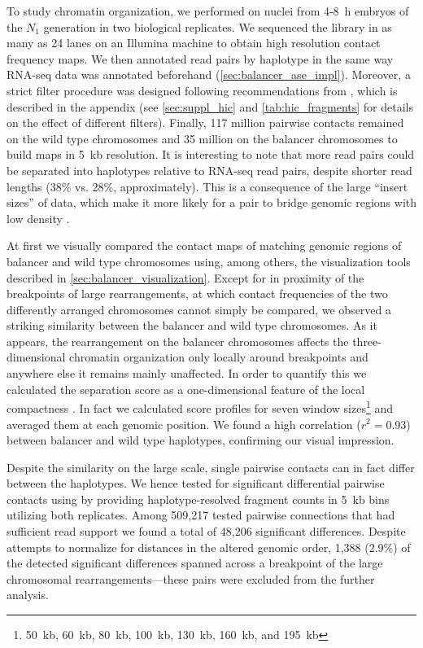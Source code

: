To study chromatin organization, we performed \hic on nuclei from 4-8~h embryos
of the $N_1$ generation in two biological replicates. We sequenced the \hic
library in as many as 24 lanes on an Illumina machine to obtain high resolution
contact frequency maps. We then annotated read pairs by haplotype in the same
way RNA-seq data was annotated beforehand (\cref{sec:balancer_ase_impl}).
Moreover, a strict filter procedure was designed following recommendations from
\cite{Ramirez2018}, which is described in the appendix (see \cref{sec:suppl_hic}
and \cref{tab:hic_fragments} for details on the effect of different filters).
Finally, 117 million pairwise contacts remained on the wild type chromosomes
and 35 million on the balancer chromosomes to build \hic maps in 5~kb
resolution. It is interesting to note that more \hic read pairs could be
separated into haplotypes relative to RNA-seq read pairs, despite shorter read
lengths (38\% vs. 28\%, approximately). This is a consequence of the large
``insert sizes'' of \hic data, which make it more likely for a pair to bridge
genomic regions with low \snv density \citep{Edge2017}.

At first we visually compared the contact maps of matching genomic regions of
balancer and wild type chromosomes using, among others, the visualization tools
described in \cref{sec:balancer_visualization}. Except for in proximity of the
breakpoints of large rearrangements, at which contact frequencies of the two
differently arranged chromosomes cannot simply be compared, we observed a
striking similarity between the balancer and wild type chromosomes. As it
appears, the rearrangement on the balancer chromosomes affects the
three-dimensional chromatin organization only locally around breakpoints and
anywhere else it remains mainly unaffected. In order to quantify this we
calculated the \tad separation score as a one-dimensional feature of the local
compactness \citep{Ramirez2015,Ramirez2018}. In fact we calculated score
profiles for seven window sizes\footnote{50~kb, 60~kb, 80~kb, 100~kb, 130~kb,
160~kb, and 195~kb} and averaged them at each genomic position. We found a high
correlation ($r^2 = 0.93$) between balancer and wild type haplotypes,
confirming our visual impression.

Despite the similarity on the large scale, single pairwise contacts can in fact
differ between the haplotypes. We hence tested for significant differential
pairwise contacts using \deseq by providing haplotype-resolved fragment counts
in 5~kb bins utilizing both \hic replicates. Among 509,217 tested pairwise
connections that had sufficient read support we found a total of 48,206
significant differences. Despite attempts to normalize for distances in the
altered genomic order, 1,388 (2.9\%) of the detected significant differences
spanned across a breakpoint of the large chromosomal rearrangements---these
pairs were excluded from the further analysis.


